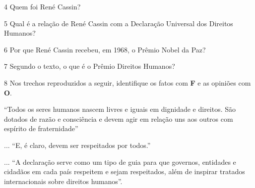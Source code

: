\begin{conteudo}
\begin{conteudo}
\begin{conteudo}
\begin{conteudo}
\begin{conteudo}

\pagebreak

\num{4} Quem foi René Cassin? 



\num{5} Qual é a relação de René Cassin com a Declaração Universal dos Direitos Humanos? 


\num{6} Por que René Cassin recebeu, em 1968, o Prêmio Nobel da Paz?


\num{7} Segundo o texto, o que é o Prêmio Direitos Humanos?


\num{8} Nos trechos reproduzidos a seguir, identifique os fatos com \textbf{F}
e as opiniões com \textbf{O}.


\begin{boxlist}
 ``Todos os seres humanos nascem livres e iguais em
dignidade e direitos. São dotados de razão e consciência e devem agir 
em relação uns aos outros com espírito de fraternidade''

 ... ``E, é claro, devem ser respeitados por todos.''

 ... ``A declaração serve como um tipo de guia para que
governos, entidades e cidadãos em cada país respeitem e sejam respeitados,
além de inspirar tratados internacionais sobre direitos humanos''.


\end{boxlist}
\end{conteudo}
\end{conteudo}
\end{conteudo}
\end{conteudo}
\end{conteudo}
